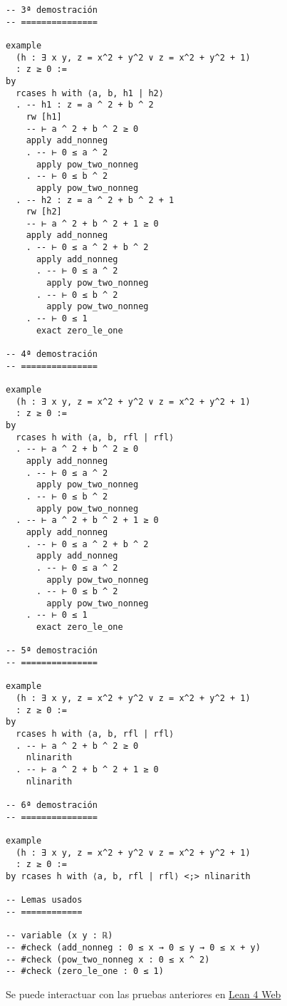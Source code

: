 \begin{verbatim}
-- 3ª demostración
-- ===============

example
  (h : ∃ x y, z = x^2 + y^2 ∨ z = x^2 + y^2 + 1)
  : z ≥ 0 :=
by
  rcases h with ⟨a, b, h1 | h2⟩
  . -- h1 : z = a ^ 2 + b ^ 2
    rw [h1]
    -- ⊢ a ^ 2 + b ^ 2 ≥ 0
    apply add_nonneg
    . -- ⊢ 0 ≤ a ^ 2
      apply pow_two_nonneg
    . -- ⊢ 0 ≤ b ^ 2
      apply pow_two_nonneg
  . -- h2 : z = a ^ 2 + b ^ 2 + 1
    rw [h2]
    -- ⊢ a ^ 2 + b ^ 2 + 1 ≥ 0
    apply add_nonneg
    . -- ⊢ 0 ≤ a ^ 2 + b ^ 2
      apply add_nonneg
      . -- ⊢ 0 ≤ a ^ 2
        apply pow_two_nonneg
      . -- ⊢ 0 ≤ b ^ 2
        apply pow_two_nonneg
    . -- ⊢ 0 ≤ 1
      exact zero_le_one

-- 4ª demostración
-- ===============

example
  (h : ∃ x y, z = x^2 + y^2 ∨ z = x^2 + y^2 + 1)
  : z ≥ 0 :=
by
  rcases h with ⟨a, b, rfl | rfl⟩
  . -- ⊢ a ^ 2 + b ^ 2 ≥ 0
    apply add_nonneg
    . -- ⊢ 0 ≤ a ^ 2
      apply pow_two_nonneg
    . -- ⊢ 0 ≤ b ^ 2
      apply pow_two_nonneg
  . -- ⊢ a ^ 2 + b ^ 2 + 1 ≥ 0
    apply add_nonneg
    . -- ⊢ 0 ≤ a ^ 2 + b ^ 2
      apply add_nonneg
      . -- ⊢ 0 ≤ a ^ 2
        apply pow_two_nonneg
      . -- ⊢ 0 ≤ b ^ 2
        apply pow_two_nonneg
    . -- ⊢ 0 ≤ 1
      exact zero_le_one

-- 5ª demostración
-- ===============

example
  (h : ∃ x y, z = x^2 + y^2 ∨ z = x^2 + y^2 + 1)
  : z ≥ 0 :=
by
  rcases h with ⟨a, b, rfl | rfl⟩
  . -- ⊢ a ^ 2 + b ^ 2 ≥ 0
    nlinarith
  . -- ⊢ a ^ 2 + b ^ 2 + 1 ≥ 0
    nlinarith

-- 6ª demostración
-- ===============

example
  (h : ∃ x y, z = x^2 + y^2 ∨ z = x^2 + y^2 + 1)
  : z ≥ 0 :=
by rcases h with ⟨a, b, rfl | rfl⟩ <;> nlinarith

-- Lemas usados
-- ============

-- variable (x y : ℝ)
-- #check (add_nonneg : 0 ≤ x → 0 ≤ y → 0 ≤ x + y)
-- #check (pow_two_nonneg x : 0 ≤ x ^ 2)
-- #check (zero_le_one : 0 ≤ 1)
\end{verbatim}
Se puede interactuar con las pruebas anteriores en \href{https://lean.math.hhu.de/\#url=https://raw.githubusercontent.com/jaalonso/Calculemus2/main/src/Desigualdad\_con\_rcases.lean.lean}{Lean 4 Web}

